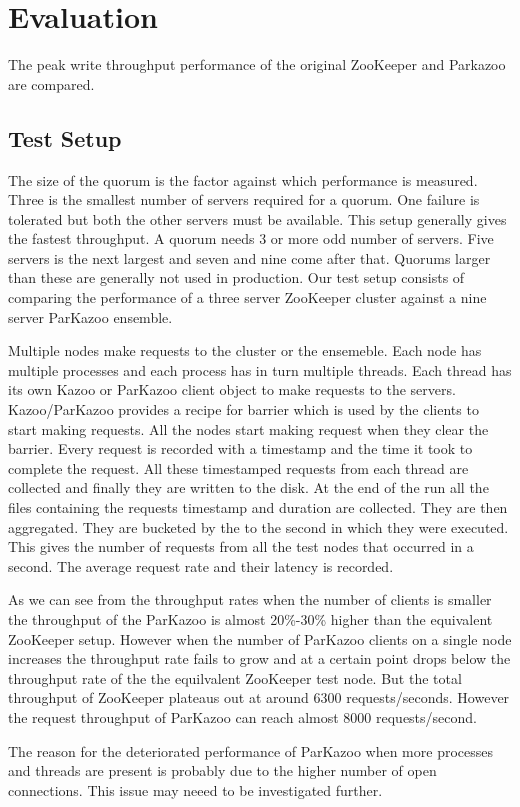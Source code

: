 \chapter{Evaluation}

The peak write throughput performance of the original ZooKeeper and Parkazoo are compared.

\section{Test Setup}
The size of the quorum is the factor against which performance is measured. Three is the smallest number of servers required for a quorum. One failure is tolerated but both the other servers must be available. This setup generally gives the fastest throughput. A quorum needs 3 or more odd number of servers. Five servers is the next largest and seven and nine come after that. Quorums larger than these are generally not used in production. Our test setup consists of comparing the performance of a three server ZooKeeper cluster against a nine server ParKazoo ensemble.

Multiple nodes make requests to the cluster or the ensemeble. Each node has multiple processes and each process has in turn multiple threads. Each thread has its own Kazoo or ParKazoo client object to make requests to the servers.
Kazoo/ParKazoo provides a recipe for barrier which is used by the clients to start making requests. All the nodes start making request when they clear the barrier. Every request is recorded with a timestamp and the time it took to complete the request. All these timestamped requests from each thread are collected and finally they are written to the disk. At the end of the run all the files containing the requests timestamp and duration are collected. They are then aggregated. They are bucketed by the to the second in which they were executed. This gives the number of requests from all the test nodes that occurred in a second. The average request rate and their latency is recorded. 


As we can see from the throughput rates when the number of clients is smaller the throughput of the ParKazoo is almost 20\%-30\% higher than the equivalent ZooKeeper setup. However when the number of ParKazoo clients on a single node increases the throughput rate fails to grow and at a certain point drops below the throughput rate of the the equilvalent ZooKeeper test node. But the total throughput of ZooKeeper plateaus out at around 6300 requests/seconds. However the request throughput of ParKazoo can reach almost 8000 requests/second.

The reason for the deteriorated performance of ParKazoo when more processes and threads are present is probably due to the higher number of open connections. This issue may neeed to be investigated further. 
